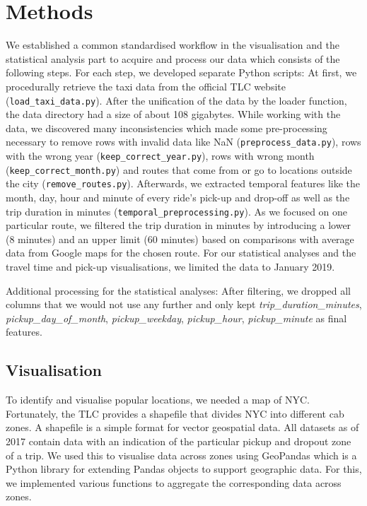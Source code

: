 \documentclass{article}
\begin{document}
\section{Methods}
We established a common standardised workflow in the visualisation and the statistical analysis part to acquire and process our data which consists of the following steps. For each step, we developed separate Python scripts: At first, we procedurally retrieve the taxi data from the official TLC website (\verb|load_taxi_data.py|). After the unification of the data by the loader function, the data directory had a size of about 108 gigabytes. While working with the data, we discovered many inconsistencies which made some pre-processing necessary to remove rows with invalid data like NaN (\verb|preprocess_data.py|), rows with the wrong year (\verb|keep_correct_year.py|), rows with wrong month (\verb|keep_correct_month.py|) and routes that come from or go to locations outside the city (\verb|remove_routes.py|). Afterwards, we extracted temporal features like the month, day, hour and minute of every ride’s pick-up and drop-off as well as the trip duration in minutes (\verb|temporal_preprocessing.py|). As we focused on one particular route, we filtered the trip duration in minutes by introducing a lower (8 minutes) and an upper limit (60 minutes) based on comparisons with average data from Google maps for the chosen route.
For our statistical analyses and the travel time and pick-up visualisations, we limited the data to January 2019.

Additional processing for the statistical analyses: After filtering, we dropped all columns that we would not use any further and only kept \emph{trip\_duration\_minutes}, \emph{pickup\_day\_of\_month}, \emph{pickup\_weekday}, \emph{pickup\_hour}, \emph{pickup\_minute} as final features.

\subsection{Visualisation}
To identify and visualise popular locations, we needed a map of NYC. Fortunately, the TLC provides a shapefile that divides NYC into different cab zones. A shapefile is a simple format for vector geospatial data. All datasets as of 2017 contain data with an indication of the particular pickup and dropout zone of a trip. We used this to visualise data across zones using GeoPandas which is a Python library for extending Pandas objects to support geographic data. For this, we implemented various functions to aggregate the corresponding data across zones.
\end{document}
